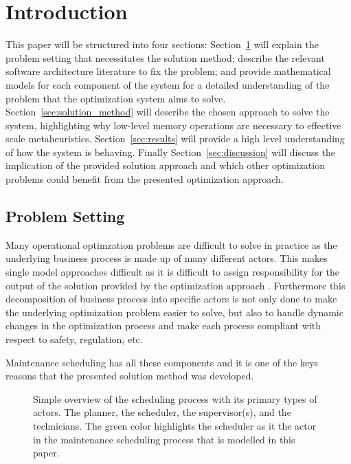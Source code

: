 \section{Introduction}\label{sec:introduction}
This paper will be structured into four sections: Section~\ref{sec:introduction} will explain the
problem setting that necessitates the solution method; describe the relevant software architecture
literature to fix the problem; and provide mathematical models for each component of the system for 
a detailed understanding of the problem that the optimization system aims to solve. Section~\ref{sec:solution_method}
will describe the chosen approach to solve the system, highlighting why low-level memory operations
are necessary to effective scale metaheuristics. Section~\ref{sec:results} will provide a high level
understanding of how the system is behaving. Finally Section~\ref{sec:discussion} will discuss the 
implication of the provided solution approach and which other optimization problems could benefit 
from the presented optimization approach.

\subsection{Problem Setting}
Many operational optimzation problems are difficult to solve in practice as the underlying business 
process is made up of many different actors. This makes single model approaches difficult as it is 
difficult to assign responsibility for the output of the solution provided by the optimization
approach \citep{INTERACTIVEOPTIMIZATION}. Furthermore this decomposition of business process into 
specific actors is not only done to make the underlying optimization problem easier to solve, but 
also to handle dynamic changes in the optimization process and make each process compliant with 
respect to safety, regulation, etc. 

Maintenance scheduling has all these components and it is one of the keys reasons that the presented
solution method was developed. 

\begin{figure}
	
	\caption{Simple overview of the scheduling process with its primary types of
		actors. The planner, the scheduler, the supervisor(s), and the technicians. 		
		The green color highlights the scheduler as it the actor in the maintenance
		scheduling process that is modelled in this paper.
	}\label{fig:integrated:maintenance-process}
\end{figure}

